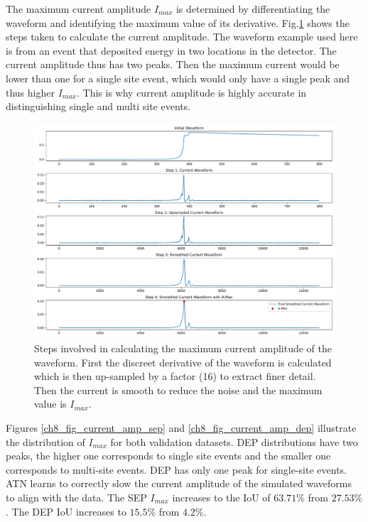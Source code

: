 The maximum current amplitude $I_{max}$ is determined by differentiating the waveform and identifying the maximum value of its derivative. Fig.\ref{fig_ch8_curr_amp_calc} shows the steps taken to calculate the current amplitude. The waveform example used here is from an event that deposited energy in two locations in the detector. The current amplitude thus has two peaks. Then the maximum current would be lower than one for a single site event, which would only have a single peak and thus higher $I_{max}$. This is why current amplitude is highly accurate in distinguishing single and multi site events.


\begin{figure}%
    \centering
    \includegraphics[width=0.99\linewidth, trim={0.4cm 0pc 0.3cm 0pc},clip]{ch8/figs/curr_amp_calc.pdf}
    \caption{Steps involved in calculating the maximum current amplitude of the waveform. First the discreet derivative of the waveform is calculated which is then up-sampled by a factor (16) to extract finer detail. Then the current is smooth to reduce the noise and the maximum value is $I_{max}$.}
    \label{fig_ch8_curr_amp_calc}
\end{figure}

Figures \ref{ch8_fig_current_amp_sep} and \ref{ch8_fig_current_amp_dep} illustrate the distribution of $I_{max}$ for both validation datasets. DEP distributions have two peaks, the higher one corresponds to single site events and the smaller one corresponds to multi-site events. DEP has only one peak for single-site events. ATN learns to correctly slow the current amplitude of the simulated waveforms to align with the data. The SEP $I_{max}$ increases to the IoU of $63.71\%$ from $27.53\%$. The DEP IoU increases to $15.5\%$ from $4.2\%$. 
  
